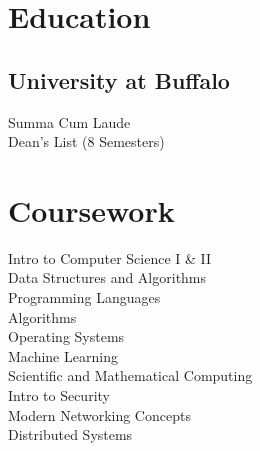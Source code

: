 \documentclass[letterpaper]{deedy-resume} %
\begin{document}
\begin{minipage}[t]{0.33\textwidth} %


\section{Education} 

\subsection{University at Buffalo}

Summa Cum Laude \\
Dean's List (8 Semesters) \\

\sectionspace %


\section{Coursework}

Intro to Computer Science I \& II \\
Data Structures and Algorithms \\
Programming Languages \\
Algorithms \\
Operating Systems \\
Machine Learning \\
Scientific and Mathematical Computing \\
Intro to Security \\
Modern Networking Concepts \\
Distributed Systems \\

\sectionspace %



\end{minipage}
\end{document}
